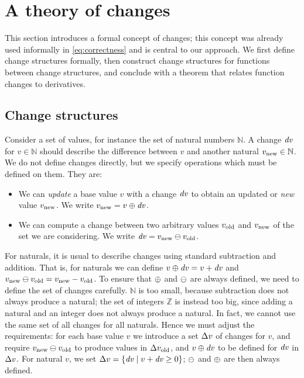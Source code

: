 \section{A theory of changes}
\label{sec:1st-order-changes}

This section introduces a formal concept of changes; this
concept was already used informally in \cref{eq:correctness} and is central
to our approach. We first define change structures formally, then construct 
change structures for functions between change structures,
and conclude with a theorem that relates function changes to derivatives. 

\subsection{Change structures}\label{ssec:change-structures}
Consider a set of values, for instance the set of natural numbers
$\mathbb{N}$. A change $\mathit{dv}$ for $v \in \mathbb{N}$ should
describe the difference between $v$ and another natural $v_{\textrm{new}}
\in \mathbb{N}$. We do not define changes directly, but we
specify operations which must be defined on them. They are:
\begin{itemize}
\item We can \emph{update} a base value $v$ with a
  change $\mathit{dv}$ to obtain an updated or \emph{new} value
  $v_{\textrm{new}}$. We write $\New{v} = \Apply{\D v}{v}$.
\item We can compute a change between two arbitrary
  values $v_{\textrm{old}}$ and $v_{\textrm{new}}$ of the set we are considering.
  We write $\D v = \Diff{\New{v}}{\Old{v}}$.
\end{itemize}

For naturals, it is usual to describe changes using standard
subtraction and addition. That is, for naturals we can define
$\Apply{\D v}{v} = v + \D v$ and $\Diff{\New{v}}{\Old{v}} =
\New{v} - \Old{v}$. To ensure that $\APPLY$ and $\DIFF$ are
always defined, we need to define the set of changes carefully.
$\mathbb{N}$ is too small, because subtraction does not always
produce a natural; the set of integers $\mathbb{Z}$ is instead
too big, since adding a natural and an integer does not always
produce a natural. In fact, we cannot use the same set of all
changes for all naturals. Hence we must adjust the requirements:
for each base value $v$ we introduce a set $\Change{v}$ of
changes for $v$, and require $\Diff{\New{v}}{\Old{v}}$ to produce
values in $\Change{\Old{v}}$, and $\Apply{\D v}{v}$ to be defined
for $\mathit{dv}$ in $\Change{v}$. For natural $v$, we set $\Change{v} =
\left\{\D v \mid v + \D v \geq 0 \right\}$; $\DIFF$ and $\APPLY$ are
then always defined.

